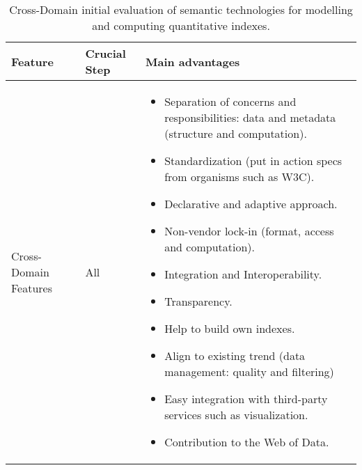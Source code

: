 \begin{table}[!htb]
\renewcommand{\arraystretch}{1.3}
\begin{center}
\begin{tabular}{|p{3.5cm}|p{3cm}|p{6.5cm}|}
\hline
  \textbf{Feature} & \textbf{Crucial Step} &\textbf{Main advantages}  \\  \hline
   Cross-Domain Features & All & \begin{itemize}
                  \item Separation of concerns and responsibilities: data and metadata (structure and computation).
                  \item Standardization (put in action specs from organisms such as W3C).
                  \item Declarative and adaptive approach.
                  \item Non-vendor lock-in (format, access and computation).
                  \item Integration and Interoperability.
                  \item Transparency.
                  \item Help to build own indexes.
                  \item Align to existing trend (data management: quality and filtering)
                  \item Easy integration with third-party services such as visualization.
                  \item Contribution to the Web of Data.
                 \end{itemize} \\ \hline              
  \hline
  \end{tabular}
  \caption{Cross-Domain initial evaluation of semantic technologies for modelling and computing quantitative indexes.}
  \label{tab:eval-rdfindex-cross}
  \end{center}
\end{table} 


 